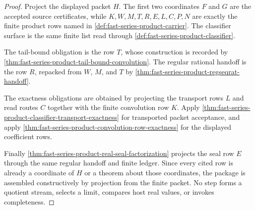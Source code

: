 \begin{proof}
Project the displayed packet $H$. The first two coordinates $F$ and $G$ are the accepted source certificates, while $K,W,M,T,R,E,L,C,P,N$ are exactly the finite product rows named in \autoref{def:fast-series-product-carrier}. The classifier surface is the same finite list read through \autoref{def:fast-series-product-classifier}.

The tail-bound obligation is the row $T$, whose construction is recorded by \autoref{thm:fast-series-product-tail-bound-convolution}. The regular rational handoff is the row $R$, repacked from $W$, $M$, and $T$ by \autoref{thm:fast-series-product-regseqrat-handoff}.

The exactness obligations are obtained by projecting the transport rows $L$ and read routes $C$ together with the finite convolution row $K$. Apply \autoref{thm:fast-series-product-classifier-transport-exactness} for transported packet acceptance, and apply \autoref{thm:fast-series-product-convolution-row-exactness} for the displayed coefficient rows.

Finally \autoref{thm:fast-series-product-real-seal-factorization} projects the seal row $E$ through the same regular handoff and finite ledger. Since every cited row is already a coordinate of $H$ or a theorem about those coordinates, the package is assembled constructively by projection from the finite packet. No step forms a quotient stream, selects a limit, compares host real values, or invokes completeness.
\end{proof}

